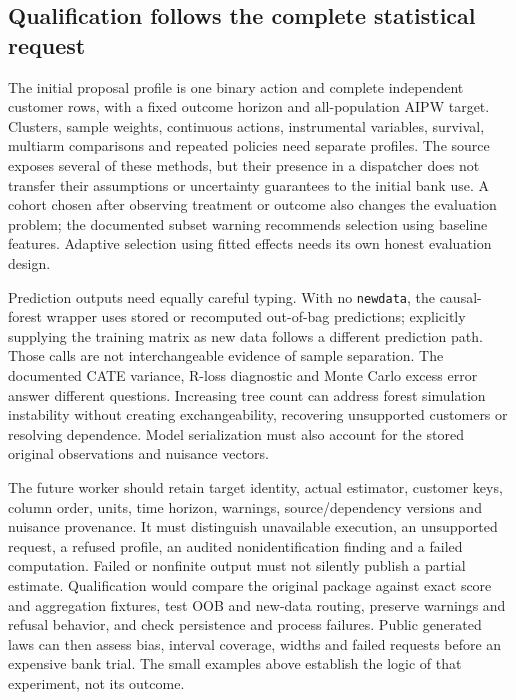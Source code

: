 \subsection{Qualification follows the complete statistical request}
\label{exec21:grfr-contract}
The initial proposal profile is one binary action and complete independent customer rows, with a fixed outcome horizon and all-population AIPW target. Clusters, sample weights, continuous actions, instrumental variables, survival, multiarm comparisons and repeated policies need separate profiles. The source exposes several of these methods, but their presence in a dispatcher does not transfer their assumptions or uncertainty guarantees to the initial bank use. A cohort chosen after observing treatment or outcome also changes the evaluation problem; the documented subset warning recommends selection using baseline features. Adaptive selection using fitted effects needs its own honest evaluation design.~\citep{exec21_grf_reuse}

Prediction outputs need equally careful typing. With no \texttt{newdata}, the causal-forest wrapper uses stored or recomputed out-of-bag predictions; explicitly supplying the training matrix as new data follows a different prediction path. Those calls are not interchangeable evidence of sample separation. The documented CATE variance, R-loss diagnostic and Monte Carlo excess error answer different questions. Increasing tree count can address forest simulation instability without creating exchangeability, recovering unsupported customers or resolving dependence. Model serialization must also account for the stored original observations and nuisance vectors.~\citep{exec21_grf_reuse}

The future worker should retain target identity, actual estimator, customer keys, column order, units, time horizon, warnings, source/dependency versions and nuisance provenance. It must distinguish unavailable execution, an unsupported request, a refused profile, an audited nonidentification finding and a failed computation. Failed or nonfinite output must not silently publish a partial estimate. Qualification would compare the original package against exact score and aggregation fixtures, test OOB and new-data routing, preserve warnings and refusal behavior, and check persistence and process failures. Public generated laws can then assess bias, interval coverage, widths and failed requests before an expensive bank trial. The small examples above establish the logic of that experiment, not its outcome.

